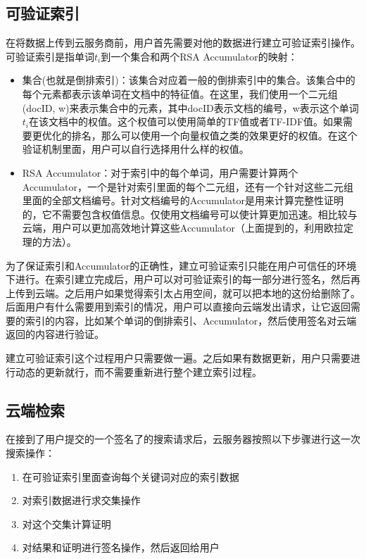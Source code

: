 \subsection{可验证索引}
在将数据上传到云服务商前，用户首先需要对他的数据进行建立可验证索引操作。可验证索引是指单词$t_i$到一个集合和两个RSA Accumulator的映射：
\begin{itemize}
\item 集合(也就是倒排索引)：该集合对应着一般的倒排索引中的集合。该集合中的每个元素都表示该单词在文档中的特征值。在这里，我们使用一个二元组(docID, w)来表示集合中的元素，其中docID表示文档的编号，w表示这个单词$t_i$在该文档中的权值。这个权值可以使用简单的TF值或者TF-IDF值。如果需要更优化的排名，那么可以使用一个向量权值之类的效果更好的权值。在这个验证机制里面，用户可以自行选择用什么样的权值。
\item RSA Accumulator：对于索引中的每个单词，用户需要计算两个Accumulator，一个是针对索引里面的每个二元组，还有一个针对这些二元组里面的全部文档编号。针对文档编号的Accumulator是用来计算完整性证明的，它不需要包含权值信息。仅使用文档编号可以使计算更加迅速。相比较与云端，用户可以更加高效地计算这些Accumulator（上面提到的，利用欧拉定理的方法）。
\end{itemize}

为了保证索引和Accumulator的正确性，建立可验证索引只能在用户可信任的环境下进行。在索引建立完成后，用户可以对可验证索引的每一部分进行签名，然后再上传到云端。之后用户如果觉得索引太占用空间，就可以把本地的这份给删除了。后面用户有什么需要用到索引的情况，用户可以直接向云端发出请求，让它返回需要的索引的内容，比如某个单词的倒排索引、Accumulator，然后使用签名对云端返回的内容进行验证。

建立可验证索引这个过程用户只需要做一遍。之后如果有数据更新，用户只需要进行动态的更新就行，而不需要重新进行整个建立索引过程。

\subsection{云端检索}
在接到了用户提交的一个签名了的搜索请求后，云服务器按照以下步骤进行这一次搜索操作：
\begin{enumerate}
\item 在可验证索引里面查询每个关键词对应的索引数据
\item 对索引数据进行求交集操作
\item 对这个交集计算证明
\item 对结果和证明进行签名操作，然后返回给用户
\end{enumerate}

